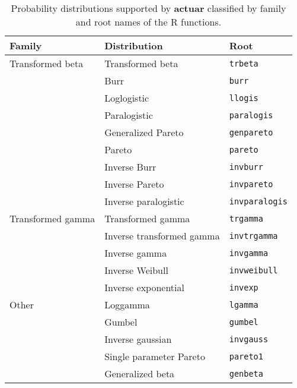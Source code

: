 \documentclass[x11names]{article}
\newcommand{\proglang}[1]{\textsf{#1}}
\newcommand{\pkg}[1]{\textbf{#1}}
\newcommand{\code}[1]{\texttt{#1}}
\begin{document}
\begin{table}
  \centering
  \begin{tabular}{lll}
    \toprule
    Family & Distribution & Root \\
    \midrule
    Transformed beta  & Transformed beta & \code{trbeta} \\
                      & Burr & \code{burr} \\
                      & Loglogistic & \code{llogis} \\
                      & Paralogistic & \code{paralogis} \\
                      & Generalized Pareto & \code{genpareto} \\
                      & Pareto & \code{pareto} \\
                      & Inverse Burr & \code{invburr} \\
                      & Inverse Pareto & \code{invpareto} \\
                      & Inverse paralogistic & \code{invparalogis} \\
    \midrule
    Transformed gamma & Transformed gamma & \code{trgamma} \\
                      & Inverse transformed gamma & \code{invtrgamma} \\
                      & Inverse gamma & \code{invgamma} \\
                      & Inverse Weibull & \code{invweibull} \\
                      & Inverse exponential & \code{invexp} \\
    \midrule
    Other             & Loggamma & \code{lgamma} \\
                      & Gumbel & \code{gumbel} \\
                      & Inverse gaussian & \code{invgauss} \\
                      & Single parameter Pareto & \code{pareto1} \\
                      & Generalized beta & \code{genbeta} \\
    \bottomrule
  \end{tabular}
  \caption{Probability distributions supported by \pkg{actuar}
    classified by family and root names of the \proglang{R}
    functions.}
  \label{tab:continuous}
\end{table}
\end{document}
